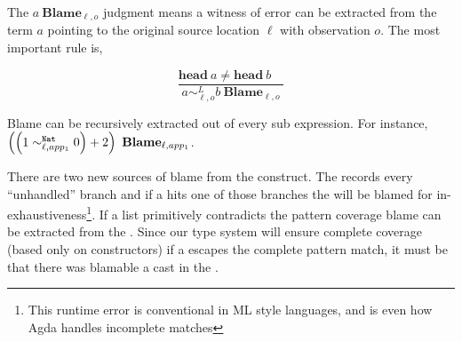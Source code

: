 The $a\ \mathbf{Blame}_{\ell,o}$ judgment means a witness of error can be extracted from the term $a$ pointing to the original source location $\ell$ with observation $o$.
The most important rule is,

\[
\frac{\mathbf{head}\ a\neq\mathbf{head}\ b\quad}{a\sim_{\ell,o}^{L}b\ \mathbf{Blame}_{\ell,o}}
\]

Blame can be recursively extracted out of every sub expression.
For instance, $\left(\left(1\sim_{\ell,app_{1}}^{\mathtt{Nat}{} }0\right)+2\right)\ \mathbf{Blame}_{\ell,app_{1}}$.

There are two new sources of blame from the \case{} construct.
The \clang{} records every ``unhandled'' branch and if a \scrut{} hits one of those branches the \case{} will be blamed for in-exhaustiveness\footnote{
  This runtime error is conventional in ML style languages, and is even
how Agda handles incomplete matches }.
If a \scrut{} list primitively contradicts the pattern coverage blame can be extracted from the \scrut{}. 
Since our type system will ensure complete coverage (based only on constructors) if a \scrut{} escapes the complete pattern match, it must be that there was blamable a cast in the \scrut.






